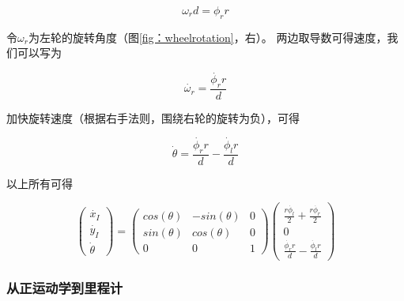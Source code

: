 \begin{equation}
\omega_r d = \phi_r r
\end{equation}

令$\omega_r$为左轮的旋转角度（图\ref {fig：wheelrotation}，右）。 两边取导数可得速度，我们可以写为

\begin{equation}
\dot{\omega_r} = \frac{\dot{\phi_r} r}{d}
\end{equation}


加快旋转速度（根据右手法则，围绕右轮的旋转为负），可得

\begin{equation}
\dot{\theta}=\frac{\dot{\phi_r} r}{d}-\frac{\dot{\phi_l} r}{d}
\end{equation}

以上所有可得

\begin{equation}\label{eq:diffwheels}
\left(\begin{array}{c} \dot{x_I}\\\dot{y_I}\\\dot{\theta}\end{array}\right)=\left(\begin{array}{ccc}
cos(\theta) & -sin(\theta) & 0 \\
sin(\theta) & cos(\theta) & 0 \\
0 & 0 & 1\end{array}\right)\left(\begin{array}{c}\frac{r\dot{\phi_l}}{2}+\frac{r\dot{\phi_r}}{2}\\0\\\frac{\dot{\phi_r} r}{d}-\frac{\dot{\phi_l} r}{d}\end{array}\right)
\end{equation}

\subsubsection{从正运动学到里程计}

